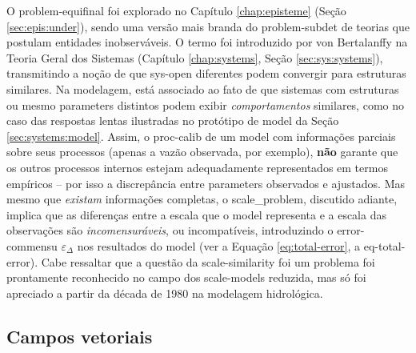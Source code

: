 \documentclass[./main.tex]{subfiles}
\begin{document}
\par O \gls{problem-equifinal} foi explorado no Capítulo \ref{chap:episteme} (Seção \ref{sec:epis:under}), sendo uma versão mais branda do \gls{problem-subdet} de teorias que postulam entidades inobserváveis. O termo  foi introduzido por von Bertalanffy na Teoria Geral dos Sistemas (Capítulo \ref{chap:systems}, Seção \ref{sec:sys:systems}), transmitindo a noção de que \gls{sys-open} diferentes podem convergir para estruturas similares. Na modelagem, está associado ao fato de que sistemas com estruturas ou mesmo \gls{parameters} distintos podem exibir \textit{comportamentos} similares, como no caso das respostas lentas ilustradas no protótipo de \gls{model} da Seção \ref{sec:systems:model}. Assim, o \gls{proc-calib} de um \gls{model} com informações parciais sobre seus processos (apenas a vazão observada, por exemplo), \textbf{não} garante que os outros processos internos estejam adequadamente representados em termos empíricos -- por isso a discrepância entre \gls{parameters} observados e ajustados. Mas mesmo que \textit{existam} informações completas, o \gls{scale_problem}, discutido adiante, implica que as diferenças entre a escala que o \gls{model} representa e a escala das observações são \textit{incomensuráveis}, ou incompatíveis, introduzindo o \gls{error-commensu} $\varepsilon_{\Delta}$ nos resultados do \gls{model} (ver a Equação \eqref{eq:total-error}, a \gls{eq-total-error}). Cabe ressaltar que a questão da \gls{scale-similarity} foi um problema foi prontamente reconhecido no campo dos \gls{scale-models} reduzida, mas só foi apreciado a partir da década de 1980 na modelagem hidrológica.

\subsection{Campos vetoriais} \label{sec:hydro:physical}
\end{document}
